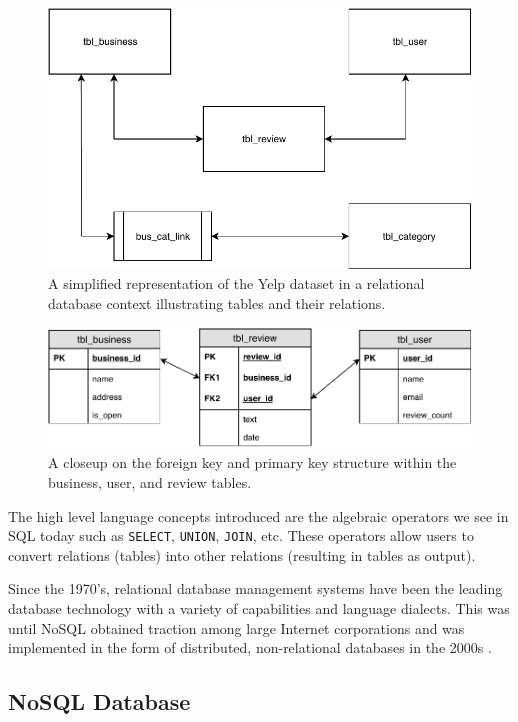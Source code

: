\begin{figure}[h]
    \centering
    \includegraphics[width=12cm]{img/relational-database.pdf}
    \caption{A simplified representation of the Yelp dataset in a relational database context illustrating tables and their relations.}
    \label{fig:relational-database}
\end{figure}

\begin{figure}[h]
    \centering
    \includegraphics[width=13cm]{img/foreign-key.pdf}
    \caption{A closeup on the foreign key and primary key structure within the business, user, and review tables.}
    \label{fig:foreign-key}
\end{figure}

The high level language concepts introduced are the algebraic operators we see in SQL today such as \verb|SELECT|, \verb|UNION|, \verb|JOIN|, etc. These operators allow users to convert relations (tables) into other relations (resulting in tables as output).

Since the 1970's, relational database management systems have been the leading database technology with a variety of capabilities and language dialects. This was until NoSQL obtained traction among large Internet corporations and was implemented in the form of distributed, non-relational databases in the 2000s \cite{data-in-nosql}.

\subsection{NoSQL Database}
\label{nosql-database}

